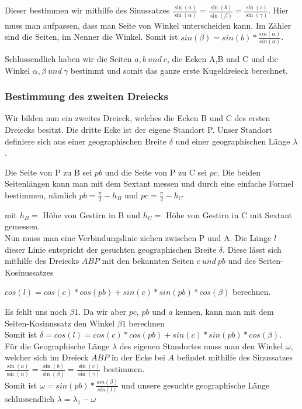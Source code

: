 \documentclass[12pt]{scrartcl}
\begin{document}
Dieser bestimmen wir mithilfe des Sinussatzes $\frac{\sin (a)}{\sin (\alpha)} =\frac{\sin (b)}{\sin (\beta)} = \frac{\sin (c)}{\sin (\gamma)}$.
Hier muss man aufpassen, dass man Seite von Winkel unterscheiden kann. Im Zähler sind die Seiten, im Nenner die Winkel. Somit ist $sin(\beta) = sin(b) * \frac{sin(\alpha)}{sin(a)} $.

Schlussendlich haben wir die Seiten $a,b\ und \ c$, die Ecken A,B und C und die Winkel $\alpha, \beta \ und \ \gamma$ bestimmt und somit das ganze erste Kugeldreieck berechnet.

\subsubsection{Bestimmung des zweiten Dreiecks}
Wir bilden nun ein zweites Dreieck, welches die Ecken B und C des ersten Dreiecks besitzt. 
Die dritte Ecke ist der eigene Standort P.
Unser Standort definiere sich aus einer geographischen Breite $\delta$ und einer geographischen Länge $\lambda$. 

Die Seite von P zu B sei $pb$ und die Seite von P zu C sei $pc$.
Die beiden Seitenlängen kann man mit dem Sextant messen und durch eine einfache Formel bestimmen, nämlich $pb=\frac{\pi}{2} - h_{B}$ und $pc=\frac{\pi}{2} - h_{C}$ 

mit $h_B=$ Höhe von Gestirn in B und $h_C=$ Höhe von Gestirn in C mit Sextant gemessen.
\\

Nun muss man eine Verbindungslinie ziehen zwischen P und A. Die Länge $l$ dieser Linie entspricht der gesuchten geographischen Breite $\delta$. Diese lässt sich mithilfe des Dreiecks $ABP$ mit den bekannten Seiten $c\ und \ pb$ und des Seiten-Kosinussatzes 

$cos(l) = cos(c)*cos(pb) + sin(c) * sin(pb)*cos(\beta)$ berechnen. 

Es fehlt uns noch $\beta1$. 
Da wir aber $pc$, $pb$ und $a$ kennen, kann man mit dem Seiten-Kosinussatz den Winkel $\beta1$ berechnen
\\

Somit ist $\delta = cos(l) = cos(c)*cos(pb) + sin(c) * sin(pb)*cos(\beta)$.
\\

Für die Geographische Länge $\lambda$ des eigenen Standortes muss man den Winkel $\omega$, welcher sich im Dreieck $ABP$ în der Ecke bei $A$ befindet mithilfe des Sinussatzes $\frac{\sin (a)}{\sin (\alpha)} =\frac{\sin (b)}{\sin (\beta)} = \frac{\sin (c)}{\sin (\gamma)}$ bestimmen. 
\\

Somit ist $\omega=sin(pb)*\frac{sin(\beta)}{sin(l)}$ und unsere gesuchte geographische Länge schlussendlich 
$\lambda=\lambda_1 - \omega$
\end{document}
